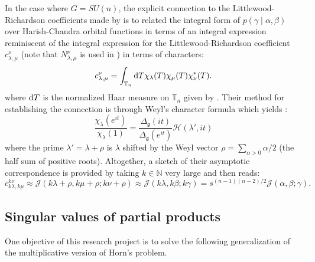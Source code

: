 \documentclass[notitlepage]{article}
\begin{document}
In the case where $G = SU(n)$, the explicit connection to the Littlewood-Richardson coefficients made by \cite{coquereaux2018orbital} is to related the integral form of $p(\gamma \mid \alpha, \beta)$ over Harish-Chandra orbital functions in terms of an integral expression reminiscent of the integral expression for the Littlewood-Richardson coefficient $c_{\lambda, \mu}^{\nu}$ (note that $N_{\lambda, \mu}^{\nu}$ is used in \cite{coquereaux2018orbital}) in terms of characters:
\begin{equation}
    c_{\lambda, \mu}^{\nu} = \int_{\mathbb{T}_{n}} \mathrm{d} T \chi_{\lambda}(T) \chi_{\mu}(T) \chi_{\nu}^{*}(T).
\end{equation}
where $\mathrm{d} T$ is the normalized Haar measure on $\mathbb T_n$ given by \cite[Equation (17)]{coquereaux2018orbital}.
Their method for establishing the connection is through Weyl's character formula which yields \cite[Section 2.2.1]{coquereaux2018orbital}:
\begin{equation}
    \frac{\chi_{\lambda}(e^{i t})}{\chi_{\lambda}(1)} = \frac{\Delta_{\mathfrak g}(it)}{\Delta_{\mathfrak g}(e^{it})} \mathcal H(\lambda', i t)
\end{equation}
where the prime $\lambda' = \lambda + \rho$ is $\lambda$ shifted by the Weyl vector $\rho = \sum_{\alpha > 0} \alpha/2$ (the half sum of positive roots).%
Altogether, a sketch of their asymptotic correspondence is provided by taking $k \in \mathbb N$ very large and then \cite[Equation (44)]{coquereaux2018orbital} reads:
\begin{equation}
    c_{k\lambda, k\mu}^{k\nu} \approx \mathcal J(k \lambda + \rho, k \mu + \rho; k \nu + \rho) \approx \mathcal J(k \lambda, k \beta; k \gamma) = s^{(n-1)(n-2)/2} \mathcal J(\alpha, \beta; \gamma).
\end{equation}

\subsection{Singular values of partial products}

One objective of this research project is to solve the following generalization of the multiplicative version of Horn's problem.
\end{document}
